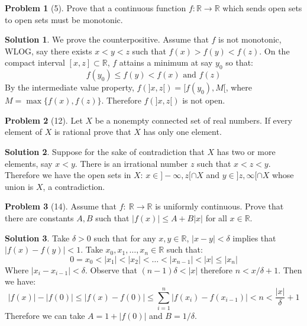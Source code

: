 \documentclass{article}
\theoremstyle{definition}
\newtheorem*{soln}{Solution}
\newtheorem*{prob}{Problem}
\theoremstyle{theorem}
\newcommand{\R}{\mathbb{R}}
\begin{document}
\begin{prob}[5]
    Prove that a continuous function $f:\R \to \R$ which sends open sets to open sets must be monotonic.
\end{prob}
\begin{soln}
We prove the counterpositive. Assume that $f$ is not monotonic, WLOG, say there exists $x<y<z$ such that $f(x)>f(y)<f(z)$. On the compact interval $[x,z]\subset \R$, $f$ attains a minimum at say $y_0$ so that:
    $$f(y_0)\leq f(y)<f(x) \text{ and } f(z)$$
    By the intermediate value property, $f(]x,z[) = [f(y_0),M[$, where $M=\max\{f(x),f(z)  \}$. Therefore $f(]x,z[)$ is not open.
\end{soln}
\vspace{1in}



\begin{prob}[12]
Let $X$ be a nonempty connected set of real numbers. If every element of $X$ is rational prove that $X$ has only one element.
\end{prob}
\begin{soln}
    Suppose for the sake of contradiction  that $X$ has two or more elements, say $x< y$. There is an irrational number $z$ such that $x<z<y$. Therefore we have the open sets in $X$:  $x\in ]-\infty, z[ \cap X$ and  $y\in ]z,\infty[\cap X$ whose union is $X$, a contradiction.
\end{soln}
\vspace{1in}


\begin{prob}[14]
    Assume that $f:\ \R\to \R$ is uniformly continuous. Prove that there are constants $A,B$ such that $|f(x)| \leq A+B|x|$ for all $x\in \R$. 
\end{prob}
\begin{soln}
    Take $\delta>0$ such that for any $x,y\in \R$, $|x-y|<\delta$ implies that $|f(x)-f(y)|<1$. Take $x_0,x_1,\ldots, x_n\in \R$ such that:
    $$0=x_0<|x_1|<|x_2|<\ldots < |x_{n-1 }|<|x|\leq  |x_n|$$
    Where $|x_i - x_{i-1 }|<\delta$. Observe that $(n-1)\delta < |x|$ therefore $n<x/\delta +1$. Then we have:
    $$|f(x)| - |f(0)| \leq |f(x)-f(0)| \leq \sum_{i=1 }^n |f(x_i)-f(x_{i-1 })|<n<\frac{|x|}{\delta} + 1$$
    Therefore we can take $A=1+|f(0)|$ and $B=1/\delta$.
\end{soln}
\vspace{1in}
\end{document}

